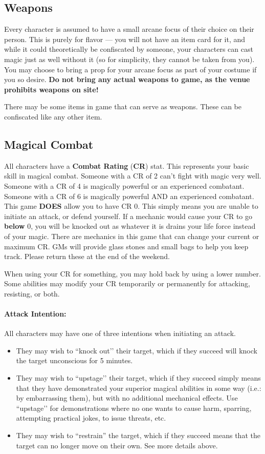 \documentclass[sheet]{GL2020}
\begin{document}
\subsection{Weapons}
Every character is assumed to have a small arcane focus of their choice on their person. This is purely for flavor — you will not have an item card for it, and while it could theoretically be confiscated by someone, your characters can cast magic just as well without it (so for simplicity, they cannot be taken from you). You may choose to bring a prop for your arcane focus as part of your costume if you so desire. \textbf{Do not bring any actual weapons to game, as the venue prohibits weapons on site!}

There may be some items in game that can serve as weapons. These can be confiscated like any other item.

\subsection{Magical Combat}
All characters have a {\bf Combat Rating} ({\bf CR}) stat. This represents your basic skill in magical combat. Someone with a CR of 2 can't fight with magic very well. Someone with a CR of 4 is magically powerful or an experienced combatant. Someone with a CR of 6 is magically powerful AND an experienced combatant. This game \textbf{DOES} allow you to have CR 0. This simply means you are unable to initiate an attack, or defend yourself. If a mechanic would cause your CR to go \textbf{below} 0, you will be knocked out as whatever it is drains your life force instead of your magic. There are mechanics in this game that can change your current or maximum CR. GMs will provide glass stones and small bags to help you keep track. Please return these at the end of the weekend.

When using your CR for something, you may hold back by using a lower number. Some abilities may modify your CR temporarily or permanently for attacking, resisting, or both.

\paragraph{Attack Intention:} All characters may have one of three intentions when initiating an attack. 
\begin{itemize}
	\item They may wish to ``knock out'’ their target, which if they succeed will knock the target unconscious for 5 minutes. 
	\item They may wish to ``upstage'’ their target, which if they succeed simply means that they have demonstrated your superior magical abilities in some way (i.e.: by embarrassing them), but with no additional mechanical effects. Use ``upstage'’ for demonstrations where no one wants to cause harm, sparring, attempting practical jokes, to issue threats, etc. \
	\item They may wish to ``restrain'' the target, which if they succeed means that the target can no longer move on their own. See more details above. 
\end{itemize}
\end{document}
